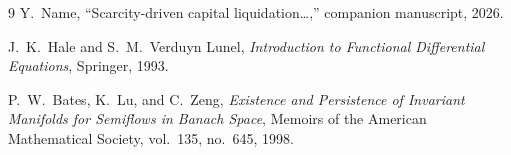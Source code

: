 \documentclass[11pt]{article}
\theoremstyle{definition}
\theoremstyle{remark}
\begin{document}
\begin{thebibliography}{9}
Y.\ Name, ``Scarcity-driven capital liquidation\ldots,'' companion manuscript, 2026.

J.\ K.\ Hale and S.\ M.\ Verduyn Lunel,
\emph{Introduction to Functional Differential Equations},
Springer, 1993.

P.\ W.\ Bates, K.\ Lu, and C.\ Zeng,
\emph{Existence and Persistence of Invariant Manifolds for Semiflows in Banach Space},
Memoirs of the American Mathematical Society, vol.~135, no.~645, 1998.
\end{thebibliography}
\end{document}
